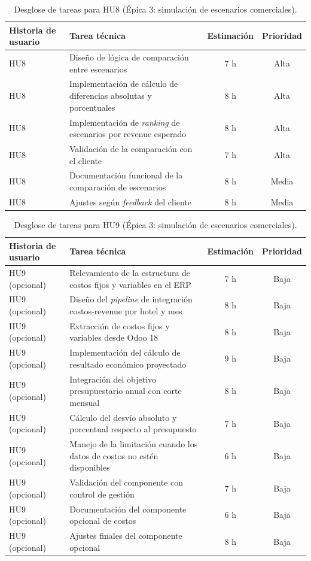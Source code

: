 \documentclass[
11pt, %
]{charter}
\begin{document}
\begin{table}[H]
\centering
\begin{tabularx}{\linewidth}{@{}|X|X|c|c|@{}}
\hline
\rowcolor[HTML]{C0C0C0}
Historia de usuario & Tarea técnica & Estimación & Prioridad \\ \hline
HU8 & Diseño de lógica de comparación entre escenarios & 7 h & Alta \\ \hline
HU8 & Implementación de cálculo de diferencias absolutas y porcentuales & 8 h & Alta \\ \hline
HU8 & Implementación de \textit{ranking} de escenarios por revenue esperado & 8 h & Alta \\ \hline
HU8 & Validación de la comparación con el cliente & 7 h & Alta \\ \hline
HU8 & Documentación funcional de la comparación de escenarios & 8 h & Media \\ \hline
HU8 & Ajustes según \textit{feedback} del cliente & 8 h & Media \\ \hline
\end{tabularx}
\caption{Desglose de tareas para HU8 (Épica 3: simulación de escenarios comerciales).}
\end{table}
 
\begin{table}[H]
\centering
\begin{tabularx}{\linewidth}{@{}|X|X|c|c|@{}}
\hline
\rowcolor[HTML]{C0C0C0}
Historia de usuario & Tarea técnica & Estimación & Prioridad \\ \hline
HU9 (opcional) & Relevamiento de la estructura de costos fijos y variables en el ERP & 7 h & Baja \\ \hline
HU9 (opcional) & Diseño del \textit{pipeline} de integración costos-revenue por hotel y mes & 8 h & Baja \\ \hline
HU9 (opcional) & Extracción de costos fijos y variables desde Odoo 18 & 8 h & Baja \\ \hline
HU9 (opcional) & Implementación del cálculo de resultado económico proyectado & 9 h & Baja \\ \hline
HU9 (opcional) & Integración del objetivo presupuestario anual con corte mensual & 8 h & Baja \\ \hline
HU9 (opcional) & Cálculo del desvío absoluto y porcentual respecto al presupuesto & 7 h & Baja \\ \hline
HU9 (opcional) & Manejo de la limitación cuando los datos de costos no estén disponibles & 6 h & Baja \\ \hline
HU9 (opcional) & Validación del componente con control de gestión & 7 h & Baja \\ \hline
HU9 (opcional) & Documentación del componente opcional de costos & 6 h & Baja \\ \hline
HU9 (opcional) & Ajustes finales del componente opcional & 8 h & Baja \\ \hline
\end{tabularx}
\caption{Desglose de tareas para HU9 (Épica 3: simulación de escenarios comerciales).}
\end{table}
\end{document}
